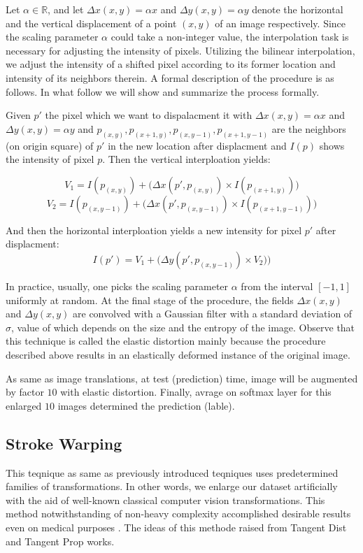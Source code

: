 Let $\alpha \in \mathbb{R}$, and let $\Delta x(x,  y) = \alpha x$ and $\Delta y(x,  y) = \alpha y$
denote the horizontal and the vertical displacement of a point $(x, y)$ of an image respectively.
Since the scaling parameter $\alpha$ could take a non-integer value, the interpolation task is
necessary for adjusting the intensity of pixels. Utilizing the bilinear interpolation, we adjust the
intensity of a shifted pixel according to its former location and intensity of its neighbors
therein. A formal description of the procedure is as follows. In what follow we will show and summarize the
process formally.

\begin{definition}{}
  Given $p'$ the pixel which we want to dispalacment it with $\Delta x(x,y)= \alpha x$ and $\Delta y(x,y)= \alpha y$ and $p_{(x,y)}, p_{(x+1,y)}, p_{(x,y-1)}, p_{(x+1,y-1)}$ are the neighbors (on
  origin square) of $p'$ in the new location after displacment and $I(p)$ shows the intensity of pixel $p$. Then the vertical interploation yields:

  $$V_1 = I(p_{(x,y)}) + \big( \Delta x(p', p_{(x,y)}) \times I(p_{(x+1,y)}) \big)$$
  $$V_2 = I(p_{(x,y-1)}) + \big( \Delta x(p', p_{(x,y-1)}) \times I(p_{(x+1,y-1)}) \big)$$

  And then the horizontal interploation yields a new intensity for pixel $p'$ after displacment:
  $$I(p') = V_1 + \big( \Delta y(p', p_{(x,y-1)}) \times V_2) \big)$$
\end{definition}

In practice, usually, one picks the scaling parameter $\alpha$ from the interval $[-1, 1]$ uniformly at random. At the final stage of the procedure, the fields  $\Delta x(x,  y)$ and $\Delta y(x,  y)$ are convolved with a Gaussian filter with a standard deviation of $\sigma$, value of which depends on the size and the entropy of the image. Observe that this technique is called the elastic distortion mainly because the procedure described above results in an elastically deformed instance of the original image.

As same as image translations, at test (prediction) time, image will be augmented by factor $10$
with elastic distortion. Finally, avrage on softmax layer for this enlarged $10$ images determined
the prediction (lable).

\subsection{Stroke Warping}
\label{tit:stroke-warping}
This teqnique as same as previously introduced teqniques uses predetermined families of transformations.
In other words, we enlarge our dataset artificially with the aid of well-known classical computer
vision transformations. This method notwithstanding of non-heavy complexity accomplished desirable
results even on medical purposes \cite{stroke_tumor}. The ideas of this methode raised from Tangent
Dist \cite{stroke_idea_1992} and Tangent Prop \cite{stroke_idea_1993} works.

